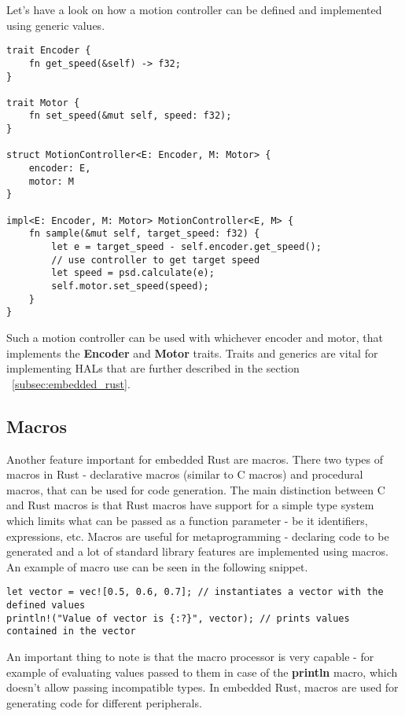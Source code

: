 Let's have a look on how a motion controller can be defined and implemented using generic values.

\begin{lstlisting}
trait Encoder {
    fn get_speed(&self) -> f32;
}

trait Motor {
    fn set_speed(&mut self, speed: f32);
}

struct MotionController<E: Encoder, M: Motor> {
    encoder: E,
    motor: M
}

impl<E: Encoder, M: Motor> MotionController<E, M> {
    fn sample(&mut self, target_speed: f32) {
        let e = target_speed - self.encoder.get_speed();
        // use controller to get target speed
        let speed = psd.calculate(e);
        self.motor.set_speed(speed);
    }
}
\end{lstlisting}

Such a motion controller can be used with whichever encoder and motor, that implements the \textbf{Encoder} and \textbf{Motor} traits.
Traits and generics are vital for implementing HALs that are further described in the section ~\ref{subsec:embedded_rust}.

\newpage
\subsection{Macros}
\label{subsec:macros}
Another feature important for embedded Rust are macros.
There two types of macros in Rust - declarative macros (similar to C macros) and procedural macros, that can be used for code generation.
The main distinction between C and Rust macros is that Rust macros have support for a simple type system which limits what can be passed as a function parameter - be it identifiers, expressions, etc.
Macros are useful for metaprogramming - declaring code to be generated and a lot of standard library features are implemented using macros.
An example of macro use can be seen in the following snippet.
\begin{lstlisting}
let vector = vec![0.5, 0.6, 0.7]; // instantiates a vector with the defined values
println!("Value of vector is {:?}", vector); // prints values contained in the vector
\end{lstlisting}

An important thing to note is that the macro processor is very capable - for example of evaluating values passed to them in case of the \textbf{println} macro, which doesn't allow passing incompatible types.
In embedded Rust, macros are used for generating code for different peripherals.

